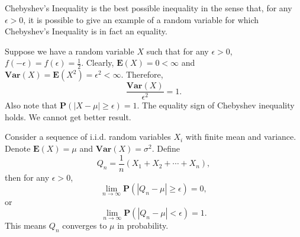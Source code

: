 Chebyshev’s Inequality is the best possible inequality in the sense that, for any $\epsilon > 0$, it is possible to give an example of a random variable for which Chebyshev’s Inequality is in fact an equality. 
\begin{example}
Suppose we have a random variable $X$ such that for any $\epsilon > 0$, $f(-\epsilon) = f(\epsilon) = \frac{1}{2}$. Clearly, $\mathbf{E}(X) = 0 < \infty$ and $\mathbf{Var}(X) = \mathbf{E}(X^2) = \epsilon^2 < \infty$. Therefore,
\begin{equation*}
    \frac{\mathbf{Var}(X)}{\epsilon^2} = 1.
\end{equation*}
Also note that $\mathbf{P}(\left\vert X-\mu \right\vert \geq \epsilon) = 1$. The equality sign of Chebyshev inequality holds. We cannot get better result.
\end{example}

\begin{theorem}
Consider a sequence of i.i.d. random variables $X_i$ with finite mean and variance. Denote $\mathbf{E}(X) = \mu$ and $\mathbf{Var}(X) = \sigma^2$. Define 
\begin{equation*}
    Q_n = \frac{1}{n}\left( X_1 + X_2 + \cdots + X_n \right),
\end{equation*}
then for any $\epsilon > 0$, 
\begin{equation*}
    \lim_{n\to\infty} \mathbf{P}(\left\vert Q_n - \mu \right\vert \geq \epsilon ) = 0,
\end{equation*}
or 
\begin{equation*}
    \lim_{n\to\infty} \mathbf{P}(\left\vert Q_n - \mu \right\vert < \epsilon) = 1.
\end{equation*}
This means $Q_n$ converges to $\mu$ in probability.
\end{theorem}

